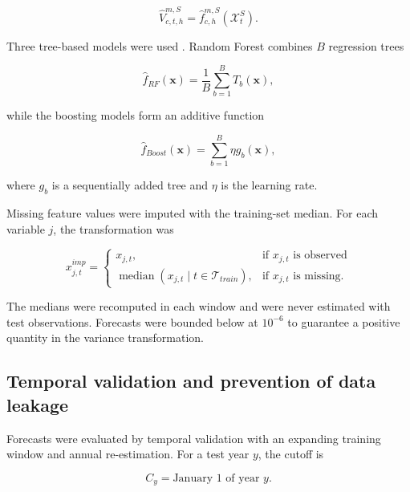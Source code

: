 \documentclass[a4paper,fleqn]{cas-sc}
\begin{document}
\begin{equation}
\widehat{V}^{m,S}_{c,t,h}
=
\widehat{f}^{m,S}_{c,h}\left(\mathcal{X}^{S}_{t}\right).
\label{eq:ml_general}
\end{equation}

Three tree-based models were used \citep{Breiman2001RandomForest,ChenGuestrin2016XGBoost,Ke2017LightGBM}. Random Forest combines \(B\) regression trees

\begin{equation}
\widehat{f}_{RF}(\mathbf{x})
=
\frac{1}{B}\sum_{b=1}^{B}T_b(\mathbf{x}),
\label{eq:rf}
\end{equation}

while the boosting models form an additive function

\begin{equation}
\widehat{f}_{Boost}(\mathbf{x})
=
\sum_{b=1}^{B}\eta g_b(\mathbf{x}),
\label{eq:boost}
\end{equation}

where \(g_b\) is a sequentially added tree and \(\eta\) is the learning rate.

Missing feature values were imputed with the training-set median. For each variable \(j\), the transformation was

\begin{equation}
x^{imp}_{j,t}
=
\begin{cases}
x_{j,t}, & \text{if }x_{j,t}\text{ is observed} \\
\operatorname{median}\left(x_{j,t}\mid t\in\mathcal{T}_{train}\right), & \text{if }x_{j,t}\text{ is missing}.
\end{cases}
\label{eq:imputation}
\end{equation}

The medians were recomputed in each window and were never estimated with test observations. Forecasts were bounded below at \(10^{-6}\) to guarantee a positive quantity in the variance transformation.

\subsection{Temporal validation and prevention of data leakage}
\label{subsec:temporal_validation}

Forecasts were evaluated by temporal validation with an expanding training window and annual re-estimation. For a test year \(y\), the cutoff is

\begin{equation}
C_y=\text{January 1 of year }y.
\label{eq:cutoff}
\end{equation}
\end{document}
